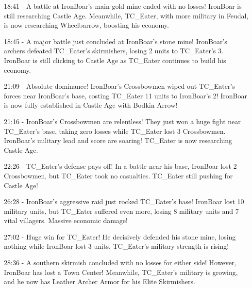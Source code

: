 18:41 - A battle at IronBoar's main gold mine ended with no losses! IronBoar is still researching Castle Age. Meanwhile, TC\_Eater, with more military in Feudal, is now researching Wheelbarrow, boosting his economy. \par \vspace{1em}

18:45 - A major battle just concluded at IronBoar's stone mine! IronBoar's archers defeated TC\_Eater's skirmishers, losing 2 units to TC\_Eater's 3. IronBoar is still clicking to Castle Age as TC\_Eater continues to build his economy. \par \vspace{1em}

21:09 - Absolute dominance! IronBoar's Crossbowmen wiped out TC\_Eater's forces near IronBoar's base, costing TC\_Eater 11 units to IronBoar's 2! IronBoar is now fully established in Castle Age with Bodkin Arrow! \par \vspace{1em}

21:16 - IronBoar's Crossbowmen are relentless! They just won a huge fight near TC\_Eater's base, taking zero losses while TC\_Eater lost 3 Crossbowmen. IronBoar's military lead and score are soaring! TC\_Eater is now researching Castle Age. \par \vspace{1em}

22:26 - TC\_Eater's defense pays off! In a battle near his base, IronBoar lost 2 Crossbowmen, but TC\_Eater took no casualties. TC\_Eater still pushing for Castle Age! \par \vspace{1em}

26:28 - IronBoar's aggressive raid just rocked TC\_Eater's base! IronBoar lost 10 military units, but TC\_Eater suffered even more, losing 8 military units and 7 vital villagers. Massive economic damage! \par \vspace{1em}

27:02 - Huge win for TC\_Eater! He decisively defended his stone mine, losing nothing while IronBoar lost 3 units. TC\_Eater's military strength is rising! \par \vspace{1em}

28:36 - A southern skirmish concluded with no losses for either side! However, IronBoar has lost a Town Center! Meanwhile, TC\_Eater's military is growing, and he now has Leather Archer Armor for his Elite Skirmishers. \par \vspace{1em}


